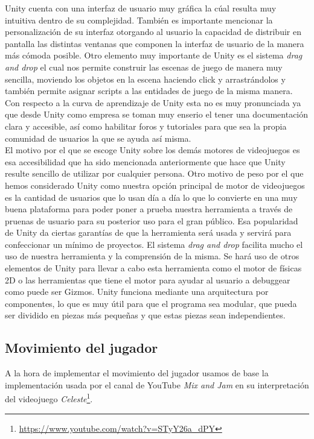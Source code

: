Unity cuenta con una interfaz de usuario muy gráfica la cúal resulta muy intuitiva dentro de su complejidad. También es importante mencionar la personalización de su interfaz otorgando al usuario la capacidad de distribuir en pantalla las distintas ventanas que componen la interfaz de usuario de la manera más cómoda posible.
Otro elemento muy importante de Unity es el sistema \textit{drag and drop} el cual nos permite construir las escenas de juego de manera muy sencilla, moviendo los objetos en la escena haciendo click y arrastrándolos y también permite asignar scripts a las entidades de juego de la misma manera. Con respecto a la curva de aprendizaje de Unity esta no es muy pronunciada ya que desde Unity como empresa se toman muy enserio el tener una documentación clara y accesible, así como habilitar foros y tutoriales para que sea la propia comunidad de usuarios la que se ayuda así misma.\\


El motivo por el que se escoge Unity sobre los demás motores de videojuegos es esa accesibilidad que ha sido mencionada anteriormente que hace que Unity resulte sencillo de utilizar por cualquier persona. Otro motivo de peso por el que hemos considerado Unity como nuestra opción principal de motor de videojuegos es la cantidad de usuarios que lo usan día a día lo que lo convierte en una muy buena plataforma para poder poner a prueba nuestra herramienta a través de pruenas de usuario para su posterior uso para el gran público. Esa popularidad de Unity da ciertas garantías de que la herramienta será usada y servirá para confeccionar un mínimo de proyectos.
El sistema \textit{drag and drop} facilita mucho el uso de nuestra herramienta y la comprensión de la misma.
Se hará uso de otros elementos de Unity para llevar a cabo esta herramienta como el motor de físicas 2D o las herramientas que tiene el motor para ayudar al usuario a debuggear como puede ser Gizmos.
Unity funciona mediante una arquitectura por componentes, lo que es muy útil para que el programa sea modular, que pueda ser dividido en piezas más pequeñas y que estas piezas sean independientes.\\

\subsection{Movimiento del jugador}

A la hora de implementar el movimiento del jugador usamos de base la implementación usada por el canal de YouTube \textit{Mix and Jam} en su interpretación del videojuego \textit{Celeste}\footnote{\url{https://www.youtube.com/watch?v=STyY26a_dPY}}.


